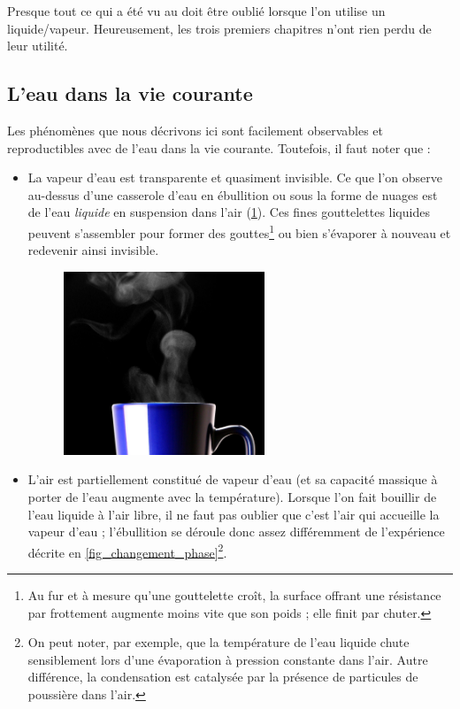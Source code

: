 		Presque tout ce qui a été vu au \coursquatre doit être oublié lorsque l’on utilise un liquide/vapeur. Heureusement, les trois premiers chapitres n’ont rien perdu de leur utilité.



	\subsection{L’eau dans la vie courante}
	
		Les phénomènes que nous décrivons ici sont facilement observables et reproductibles avec de l’eau dans la vie courante. Toutefois, il faut noter que :
			
			\begin{itemize}
				\item La vapeur d’eau est transparente et quasiment invisible. Ce que l’on observe au-dessus d’une casserole d’eau en ébullition ou sous la forme de nuages est de l’eau \emph{liquide} en suspension dans l’air (\cref{fig_tazaazul}). Ces fines gouttelettes liquides peuvent s’assembler pour former des gouttes\footnote{Au fur et à mesure qu’une gouttelette croît, la surface offrant une résistance par frottement augmente moins vite que son poids ; elle finit par chuter.} ou bien s’évaporer à nouveau et redevenir ainsi invisible.
				
			\begin{figure}
				\begin{center}
					\includegraphics[width=6cm]{images/taza_azul.jpg}
				\end{center}
				\label{fig_tazaazul}
			\end{figure}
				
				\item L’air est partiellement constitué de vapeur d’eau (et sa capacité massique à porter de l’eau augmente avec la température). Lorsque l’on fait bouillir de l’eau liquide à l’air libre, il ne faut pas oublier que c’est l’air qui accueille la vapeur d’eau ; l’ébullition se déroule donc assez différemment de l’expérience décrite en \cref{fig_changement_phase}\footnote{On peut noter, par exemple, que la température de l’eau liquide chute sensiblement lors d’une évaporation à pression constante dans l’air. Autre différence, la condensation est catalysée par la présence de particules de poussière dans l’air.}\nolinebreak.
			\end{itemize}


